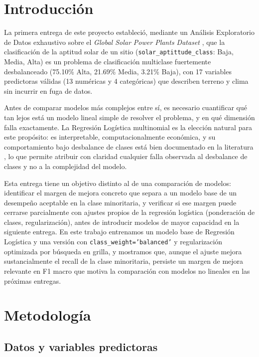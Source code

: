 \documentclass[pdflatex,sn-mathphys-num]{sn-jnl}
\begin{document}
\section{Introducción}\label{sec:intro}

La primera entrega de este proyecto estableció, mediante un Análisis Exploratorio de Datos exhaustivo sobre el \textit{Global Solar Power Plants Dataset} \cite{bib1}, que la clasificación de la aptitud solar de un sitio (\texttt{solar\_aptittude\_class}: Baja, Media, Alta) es un problema de clasificación multiclase fuertemente desbalanceado (75.10\% Alta, 21.69\% Media, 3.21\% Baja), con 17 variables predictoras válidas (13 numéricas y 4 categóricas) que describen terreno y clima sin incurrir en fuga de datos.

Antes de comparar modelos más complejos entre sí, es necesario cuantificar qué tan lejos está un modelo lineal simple de resolver el problema, y en qué dimensión falla exactamente. La Regresión Logística multinomial \cite{bib2} es la elección natural para este propósito: es interpretable, computacionalmente económica, y su comportamiento bajo desbalance de clases está bien documentado en la literatura \cite{bib3}, lo que permite atribuir con claridad cualquier falla observada al desbalance de clases y no a la complejidad del modelo.

Esta entrega tiene un objetivo distinto al de una comparación de modelos: identificar el margen de mejora concreto que separa a un modelo base de un desempeño aceptable en la clase minoritaria, y verificar si ese margen puede cerrarse parcialmente con ajustes propios de la regresión logística (ponderación de clases, regularización), antes de introducir modelos de mayor capacidad en la siguiente entrega. En este trabajo entrenamos un modelo base de Regresión Logística y una versión con \texttt{class\_weight='balanced'} y regularización optimizada por búsqueda en grilla, y mostramos que, aunque el ajuste mejora sustancialmente el recall de la clase minoritaria, persiste un margen de mejora relevante en F1 macro que motiva la comparación con modelos no lineales en las próximas entregas.

\section{Metodología}\label{sec:metodologia}

\subsection{Datos y variables predictoras}\label{subsec:datos}
\end{document}

